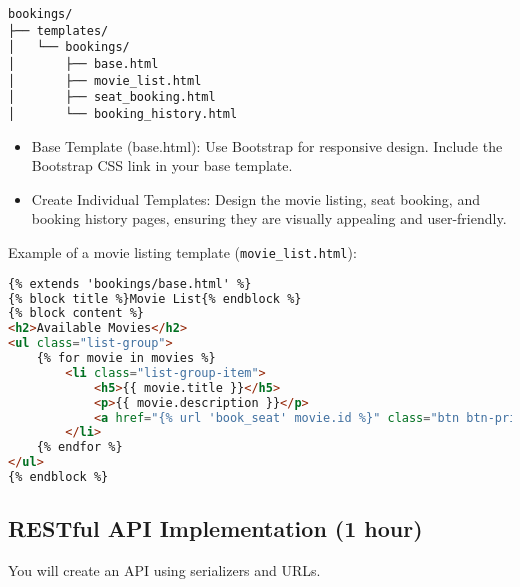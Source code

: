 \documentclass{article}
\begin{document}
\begin{verbatim}
bookings/
├── templates/
│   └── bookings/
│       ├── base.html
│       ├── movie_list.html
│       ├── seat_booking.html
│       └── booking_history.html
\end{verbatim}

\begin{itemize}
    \item Base Template (base.html): Use Bootstrap for responsive design. Include the Bootstrap CSS link in your base template.

    \item Create Individual Templates: Design the movie listing, seat booking, and booking history pages, ensuring they are visually appealing and user-friendly.

\end{itemize}

Example of a movie listing template (\texttt{movie\_list.html}):
\begin{lstlisting}[style=customcode,language=html]
{% extends 'bookings/base.html' %}
{% block title %}Movie List{% endblock %}
{% block content %}
<h2>Available Movies</h2>
<ul class="list-group">
    {% for movie in movies %}
        <li class="list-group-item">
            <h5>{{ movie.title }}</h5>
            <p>{{ movie.description }}</p>
            <a href="{% url 'book_seat' movie.id %}" class="btn btn-primary">Book Now</a>
        </li>
    {% endfor %}
</ul>
{% endblock %}
\end{lstlisting}

\subsection{RESTful API Implementation (1 hour)}
You will create an API using serializers and URLs. 
\end{document}
